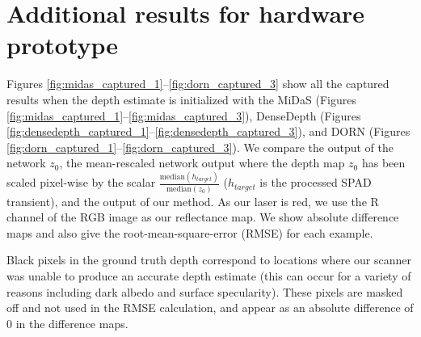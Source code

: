 \documentclass[runningheads]{llncs}
\begin{document}
\section{Additional results for hardware prototype}
Figures \ref{fig:midas_captured_1}--\ref{fig:dorn_captured_3} show all the
captured results when the depth estimate is initialized with the MiDaS
\cite{Lasinger:2019} (Figures \ref{fig:midas_captured_1}--\ref{fig:midas_captured_3}),
DenseDepth (Figures \ref{fig:densedepth_captured_1}--\ref{fig:densedepth_captured_3}),
and DORN (Figures \ref{fig:dorn_captured_1}--\ref{fig:dorn_captured_3}). We compare
the output of the network $z_0$, the mean-rescaled network output where the
depth map $z_0$ has been scaled pixel-wise by the scalar
$\frac{\text{median}(h_{target})}{\text{median}(z_0)}$ ($h_{target}$ is the
processed SPAD transient), and the output of our method. As our laser is red, we
use the R channel of the RGB image as our reflectance map. We show absolute
difference maps and also give the root-mean-square-error (RMSE) for each
example.

Black pixels in the ground truth depth correspond to locations where our scanner
was unable to produce an accurate depth estimate (this can occur for a variety
of reasons including dark albedo and surface specularity). These pixels are masked off and not used in the RMSE
calculation, and appear as an absolute difference of 0 in the difference maps.
 

\clearpage 

{\small


}
\end{document}
